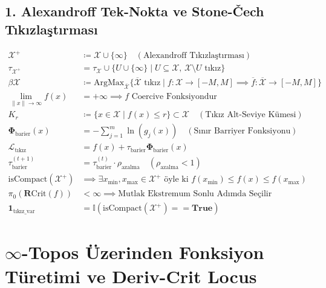 \documentclass[11pt, a4paper]{article}
\begin{document}
\subsection{1. Alexandroff Tek-Nokta ve Stone-Čech Tıkızlaştırması}
\begin{align}
\mathcal{X}^+ &\coloneqq \mathcal{X} \cup \{ \infty \} \quad (\text{Alexandroff Tıkızlaştırması}) \\
\tau_{\mathcal{X}^+} &= \tau_{\mathcal{X}} \cup \{ U \cup \{ \infty \} \mid U \subseteq \mathcal{X}, \, \mathcal{X} \setminus U \text{ tıkız} \} \\
\beta\mathcal{X} &\coloneqq \text{ArgMax}_{\overline{\mathcal{X}}} \{ \overline{\mathcal{X}} \text{ tıkız} \mid f : \mathcal{X} \to [-M, M] \implies \overline{f} : \overline{\mathcal{X}} \to [-M, M] \} \\
\lim_{\|x\| \to \infty} f(x) &= +\infty \implies f \text{ Coercive Fonksiyondur} \\
K_r &\coloneqq \{ x \in \mathcal{X} \mid f(x) \le r \} \subset \mathcal{X} \quad (\text{Tıkız Alt-Seviye Kümesi}) \\
\mathbf{\Phi}_{\text{barier}}(x) &= -\sum_{j=1}^m \ln(g_j(x)) \quad (\text{Sınır Barriyer Fonksiyonu}) \\
\mathcal{L}_{\text{tıkız}} &= f(x) + \tau_{\text{barier}} \mathbf{\Phi}_{\text{barier}}(x) \\
\tau_{\text{barier}}^{(t+1)} &= \tau_{\text{barier}}^{(t)} \cdot \rho_{\text{azalma}} \quad (\rho_{\text{azalma}} < 1) \\
\text{isCompact}(\mathcal{X}^+) &\implies \exists x_{\min}, x_{\max} \in \mathcal{X}^+ \text{ öyle ki } f(x_{\min}) \le f(x) \le f(x_{\max}) \\
\pi_0(\mathbf{R}\text{Crit}(f)) &< \infty \implies \text{Mutlak Ekstremum Sonlu Adımda Seçilir} \\
\mathbf{1}_{\text{tıkız\_var}} &= \mathbb{I}(\text{isCompact}(\mathcal{X}^+) == \mathbf{True})
\end{align}

\section{$\infty$-Topos Üzerinden Fonksiyon Türetimi ve Deriv-Crit Locus}
\end{document}
